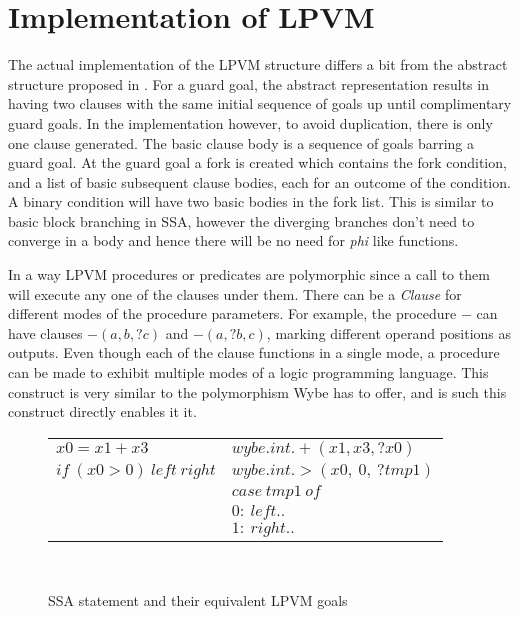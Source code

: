 \chapter{Implementation of LPVM}

The actual implementation of the LPVM structure differs a bit from the abstract
structure proposed in \cite{lpvm2015}. For a guard goal, the abstract
representation results in having two clauses with the same initial sequence of
goals up until complimentary guard goals. In the implementation however, to
avoid duplication, there is only one clause generated. The basic clause body is
a sequence of goals barring a guard goal. At the guard goal a fork is created
which contains the fork condition, and a list of basic subsequent clause
bodies, each for an outcome of the condition. A binary condition will have two
basic bodies in the fork list. This is similar to basic block branching in SSA,
however the diverging branches don't need to converge in a body and hence there
will be no need for \textit{phi} like functions.

In a way LPVM procedures or predicates are polymorphic since a call to them
will execute any one of the clauses under them. There can be a \textit{Clause}
for different modes of the procedure parameters. For example, the procedure
\( - \) can have clauses \( -(a, b, ?c) \) and \( -(a, ?b, c) \), marking
different operand positions as outputs. Even though each of the clause
functions in a single mode, a procedure can be made to exhibit multiple modes
of a logic programming language. This construct is very similar to the
polymorphism Wybe has to offer, and is such this construct directly enables it
it. 


\begin{figure}
  \centering
  \begin{tabular}{l@{\hskip 1in} l}
    \( x0 = x1 + x3 \)              & \( wybe.int.+(x1, x3, ?x0) \) \\
    \( if\ (x0 > 0)\ left\ right \) & \( wybe.int.>(x0,\ 0,\ ?tmp1) \) \\
                                    & \( case\ tmp1\ of \) \\
                                    & \( 0:\ left.. \) \\
                                    & \( 1:\ right.. \) \\
    

  \end{tabular}
  \\
  \caption{SSA statement and their equivalent LPVM goals}
\end{figure}


